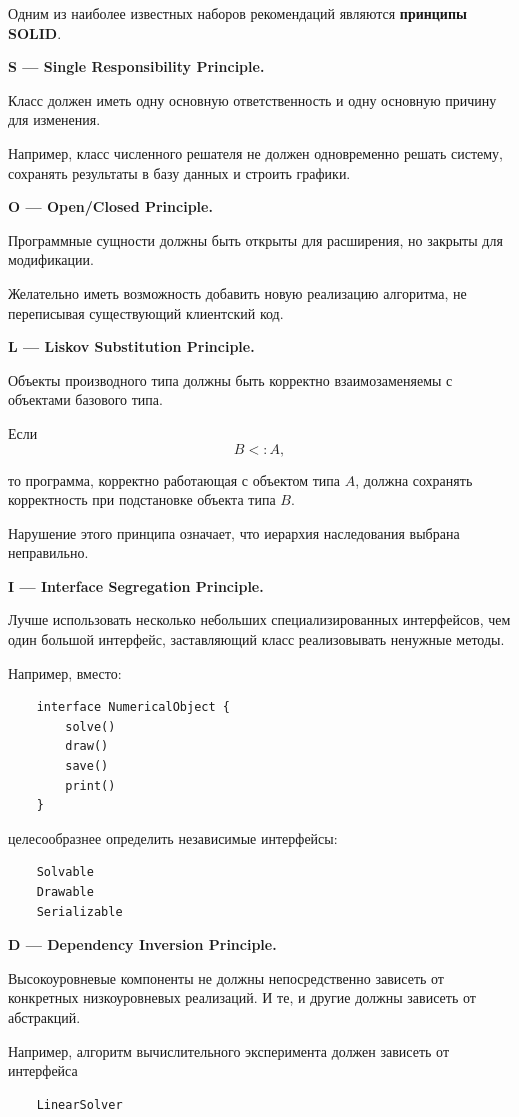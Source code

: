 Одним из наиболее известных наборов рекомендаций являются \textbf{принципы SOLID}.

\textbf{S --- Single Responsibility Principle.}

Класс должен иметь одну основную ответственность и одну основную причину для изменения.

Например, класс численного решателя не должен одновременно решать систему, сохранять результаты в базу данных и строить графики.

\textbf{O --- Open/Closed Principle.}

Программные сущности должны быть открыты для расширения, но закрыты для модификации.

Желательно иметь возможность добавить новую реализацию алгоритма, не переписывая существующий клиентский код.

\textbf{L --- Liskov Substitution Principle.}

Объекты производного типа должны быть корректно взаимозаменяемы с объектами базового типа.

Если
\[
B <: A,
\]

то программа, корректно работающая с объектом типа $A$, должна сохранять корректность при подстановке объекта типа $B$.

Нарушение этого принципа означает, что иерархия наследования выбрана неправильно.

\textbf{I --- Interface Segregation Principle.}

Лучше использовать несколько небольших специализированных интерфейсов, чем один большой интерфейс, заставляющий класс реализовывать ненужные методы.

Например, вместо:
\begin{verbatim}
	interface NumericalObject {
		solve()
		draw()
		save()
		print()
	}
\end{verbatim}

целесообразнее определить независимые интерфейсы:
\begin{verbatim}
	Solvable
	Drawable
	Serializable
\end{verbatim}

\textbf{D --- Dependency Inversion Principle.}

Высокоуровневые компоненты не должны непосредственно зависеть от конкретных низкоуровневых реализаций. И те, и другие должны зависеть от абстракций.

Например, алгоритм вычислительного эксперимента должен зависеть от интерфейса
\begin{verbatim}
	LinearSolver
\end{verbatim}

